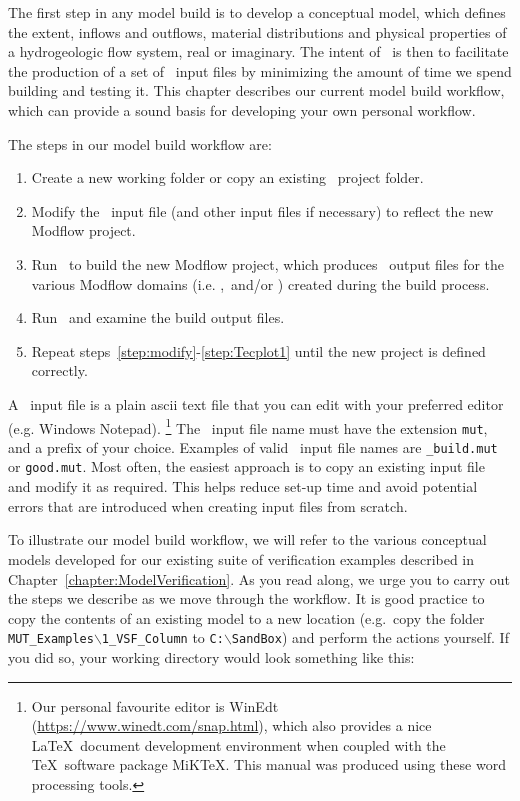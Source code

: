 \label{chapter:ModelBuild}
The first step in any model build is to develop a conceptual model, which defines the extent, inflows and outflows, material distributions and physical properties of a hydrogeologic flow system, real or imaginary. The intent of \mut\ is then to facilitate the production of a set of \mfus\ input files by minimizing the amount of time we spend building and testing it.  This chapter describes our current model build workflow, which can provide a sound basis for developing your own personal workflow.

The steps in our model build workflow are:
\begin{enumerate}
    \item Create a new working folder or copy an existing \mut\ project folder. \label{step:copy}
    \item Modify the \mut\ input file (and other input files if necessary) to reflect the new Modflow project.\label{step:modify}
    \item Run \mut\ to build the new Modflow project, which produces \tecplot\ output files for the various Modflow domains (i.e. \gwf,\swf\ and/or \cln ) created during the build process. \label{step:mut1}
    \item Run \tecplot\ and examine the build output files.   \label{step:Tecplot1}
    \item Repeat steps~\ref{step:modify}-\ref{step:Tecplot1} until the new project is defined correctly.
\end{enumerate}

A \mut\ input file is a plain ascii text file that you can edit with your preferred editor (e.g. Windows Notepad). \footnote{Our personal favourite editor is WinEdt (\url{https://www.winedt.com/snap.html}), which also provides a nice \LaTeX\ document development environment when coupled with the \TeX\ software package MiKTeX.  This manual was produced using these word processing tools.}
The \mut\ input file name must have the extension \texttt{mut}, and a prefix of your choice. Examples of valid \mut\ input file names are \texttt{\_build.mut} or \texttt{good.mut}. Most often, the easiest approach is to copy an existing input file and modify it as required.  This helps reduce set-up time and avoid potential errors that are introduced when creating input files from scratch.

To illustrate our model build workflow, we will refer to the various conceptual models developed for our existing suite of verification examples described in  Chapter~\ref{chapter:ModelVerification}.  As you read along, we urge you to carry out the steps we describe as we move through the workflow.  It is good practice to copy the contents of an existing model to a new location (e.g.\ copy the folder \texttt{MUT\_Examples$\backslash$1\_VSF\_Column} to \texttt{C:$\backslash$SandBox}) and perform the actions yourself.  If you did so, your working directory would look something like this:

